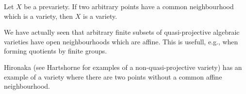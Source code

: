 \documentclass[a4paper,parskip=half,numbers=enddot, DIV=12]{scrreprt}
\begin{document}
    \begin{rem*}
        \begin{alphanumerate}
          \item 
            Let $X$ be a prevariety. If two arbitrary points have a common neighbourhood which is a variety, then $X$ is a variety.
          \item 
            We have actually seen that arbitrary finite subsets of quasi-projective algebraic varieties have open neighbourhoods which are affine. This is usefull, e.g., when forming quotients by finite groups.
          \item
            Hironaka (see Hartshorne for examples of a non-quasi-projective variety) has an example of a variety where there are two points without a common affine neighbourhood.
        \end{alphanumerate}
        
    \end{rem*}
\end{document}
